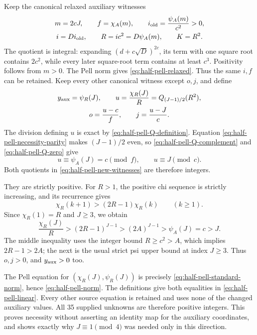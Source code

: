 Keep the canonical relaxed auxiliary witnesses
\begin{equation}\label{eq:half-pell-necessity-auxiliary}
 \begin{gathered}
 m=2cJ,\qquad f=\chi_A(m),\qquad
 i_{\rm old}=\frac{\psi_A(m)}{c^2}>0,\\
 i=Di_{\rm old},\qquad R=ic^2=D\psi_A(m),\qquad K=R^2.
 \end{gathered}
\end{equation}
The quotient is integral: expanding
$(d+c\sqrt D)^{2c}$, its term with one square root contains
$2c^2$, while every later square-root term contains at least $c^3$.
Positivity follows from $m>0$. The Pell norm gives
\eqref{eq:half-pell-relaxed}. Thus the same $i,f$ can be retained.
Keep every other canonical witness except $o,j$, and define
\begin{equation}\label{eq:half-pell-new-witnesses}
 \begin{gathered}
 y_{\rm aux}=\psi_R(J),\qquad
 u=\frac{\chi_R(J)}R=Q_{(J-1)/2}(R^2),\\
 o=\frac{u-c}{f},\qquad j=\frac{u-J}{c}.
 \end{gathered}
\end{equation}
The division defining $u$ is exact by
\eqref{eq:half-pell-Q-definition}. Equation
\eqref{eq:half-pell-necessity-parity} makes $(J-1)/2$ even, so
\eqref{eq:half-pell-Q-complement} and
\eqref{eq:half-pell-Q-zero} give
\[
 u\equiv\psi_A(J)=c\pmod f,\qquad u\equiv J\pmod c.
\]
Both quotients in \eqref{eq:half-pell-new-witnesses} are therefore
integers.

They are strictly positive. For $R>1$, the positive chi sequence
is strictly increasing, and its recurrence gives
\[
 \chi_R(k+1)>(2R-1)\chi_R(k)\qquad(k\ge1).
\]
Since $\chi_R(1)=R$ and $J\ge3$, we obtain
\begin{equation}\label{eq:half-pell-positive-quotients}
 \frac{\chi_R(J)}R>(2R-1)^{J-1}
   >(2A)^{J-1}>\psi_A(J)=c>J.
\end{equation}
The middle inequality uses the integer bound $R\ge c^2>A$,
which implies $2R-1>2A$; the next is the usual strict psi upper
bound at index $J\ge3$. Thus $o,j>0$, and $y_{\rm aux}>0$ too.

The Pell equation for $(\chi_R(J),\psi_R(J))$ is precisely
\eqref{eq:half-pell-standard-norm}, hence
\eqref{eq:half-pell-norm}. The definitions give both equalities
in \eqref{eq:half-pell-linear}. Every other source equation is
retained and uses none of the changed auxiliary values. All 35
supplied unknowns are therefore positive integers. This proves
necessity without asserting an identity map for the auxiliary
coordinates, and shows exactly why $J\equiv1\pmod4$ was needed
only in this direction.

